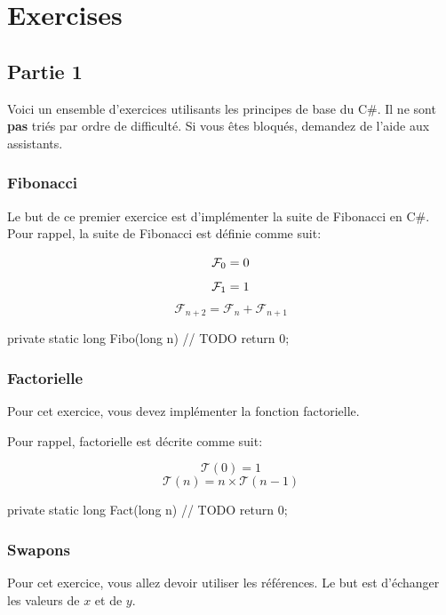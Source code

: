 \newpage
\section{Exercises}

\subsection{Partie 1}

Voici un ensemble d'exercices utilisants les principes de base du C\#.
Il ne sont \textbf{pas} triés par ordre de difficulté. Si vous êtes bloqués, demandez de
l'aide aux assistants.

\subsubsection{Fibonacci}

Le but de ce premier exercice est d'implémenter la suite de Fibonacci en C\#.
Pour rappel, la suite de Fibonacci est définie comme suit:

$$
\mathcal{F}_0 = 0\\
$$
$$
\mathcal{F}_1 = 1\\
$$
$$
\mathcal{F}_{n+2} = \mathcal{F}_{n} + \mathcal{F}_{n + 1}
$$

\begin{code}
private static long Fibo(long n)
{
	// TODO
    return 0;
}
\end{code}

\subsubsection{Factorielle}

Pour cet exercice, vous devez implémenter la fonction factorielle.

Pour rappel, factorielle est décrite comme suit:

$$
\mathcal{T}(0) = 1
$$
$$
\mathcal{T}(n) = n \times \mathcal{T}(n - 1)
$$

\begin{code}
private static long Fact(long n)
{
	// TODO
    return 0;
}
\end{code}

\subsubsection{Swapons}

Pour cet exercice, vous allez devoir utiliser les références.
Le but est d'échanger les valeurs de \(x\) et de \(y\).

